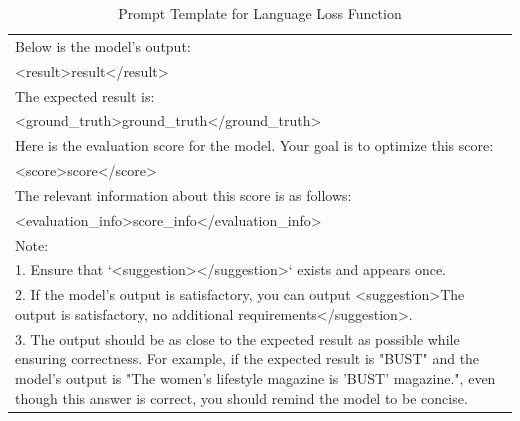 \documentclass{article}
\begin{document}
\begin{table}[htbp]
{\begin{tabular}{p{15cm}}
Below is the model's output:\\
<result>{result}</result>\par\\

The expected result is:\\
<ground\_truth>{ground\_truth}</ground\_truth>\par\\

Here is the evaluation score for the model. Your goal is to optimize this score:\\
<score>{score}</score>\par\\

The relevant information about this score is as follows:\\
<evaluation\_info>{score\_info}</evaluation\_info>\par\\

Note:\\
1. Ensure that `<suggestion></suggestion>` exists and appears once.\\
2. If the model's output is satisfactory, you can output <suggestion>The output is satisfactory, no additional requirements</suggestion>.\\
3. The output should be as close to the expected result as possible while ensuring correctness. For example, if the expected result is "BUST" and the model's output is "The women's lifestyle magazine is 'BUST' magazine.", even though this answer is correct, you should remind the model to be concise.\\
\bottomrule
\end{tabular}
}
\caption{Prompt Template for Language Loss Function}
\label{tab:prompt_language_loss}
\end{table}
\end{document}
